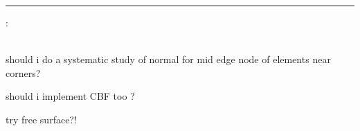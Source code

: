 \newpage
\par\noindent\rule{\textwidth}{0.4pt}


\vspace{.5cm}

\noindent\Literature:\\
\\

should i do a systematic study of normal for mid edge node of elements near corners?

should i implement CBF too ?

try free surface?!
